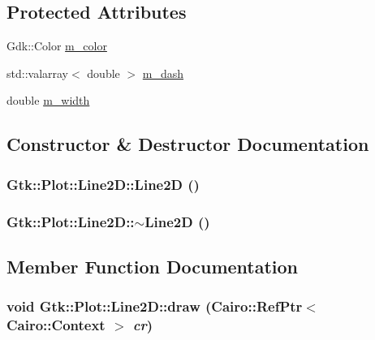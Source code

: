 \subsection*{Protected Attributes}
\begin{DoxyCompactItemize}
\item 
Gdk::Color \hyperlink{classGtk_1_1Plot_1_1Line2D_ae322075b3cd8da490e47b3a0076d1b85}{m\_\-color}
\item 
std::valarray$<$ double $>$ \hyperlink{classGtk_1_1Plot_1_1Line2D_aa151e28045058d271b3f254cc078273e}{m\_\-dash}
\item 
double \hyperlink{classGtk_1_1Plot_1_1Line2D_a455d1610bfbfe269754464d2ba79cefb}{m\_\-width}
\end{DoxyCompactItemize}


\subsection{Constructor \& Destructor Documentation}
\hypertarget{classGtk_1_1Plot_1_1Line2D_af2f675904e4cdb37d958ad4d120798b4}{
\subsubsection[{Line2D}]{\setlength{\rightskip}{0pt plus 5cm}Gtk::Plot::Line2D::Line2D ()}}
\label{classGtk_1_1Plot_1_1Line2D_af2f675904e4cdb37d958ad4d120798b4}
\hypertarget{classGtk_1_1Plot_1_1Line2D_abd9b0ace1e06932272a3dbd3f1009edf}{
\subsubsection[{$\sim$Line2D}]{\setlength{\rightskip}{0pt plus 5cm}Gtk::Plot::Line2D::$\sim$Line2D ()}}
\label{classGtk_1_1Plot_1_1Line2D_abd9b0ace1e06932272a3dbd3f1009edf}


\subsection{Member Function Documentation}
\hypertarget{classGtk_1_1Plot_1_1Line2D_a4f5fc46b03bac4dc0a87fe7dd4945cf1}{
\subsubsection[{draw}]{\setlength{\rightskip}{0pt plus 5cm}void Gtk::Plot::Line2D::draw (Cairo::RefPtr$<$ Cairo::Context $>$ {\em cr})}}
\label{classGtk_1_1Plot_1_1Line2D_a4f5fc46b03bac4dc0a87fe7dd4945cf1}


